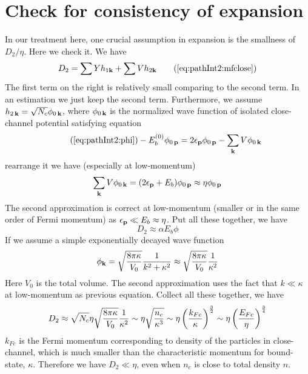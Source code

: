 \section{Check for consistency of expansion\label{sec:pathApp:consistency}}
In our treatment here, one crucial assumption in expansion is the smallness of $D_{2}/\eta$.  Here we check it.  We have 
\begin{equation}
D_{2}=\sum{}Yh_{1\vk}+\sum{}Vh_{2\vk}\tag{\ref{eq:pathInt2:mfclose}}
\end{equation}
The first term on the right is relatively small comparing to the second term.  In an estimation we just keep the second term.  Furthermore,  we assume $h_{2\,\mathbf{k}}=\sqrt{N_{c}}\phi_{0\,\mathbf{k}}$, where $\phi_{0\,\mathbf{k}}$ is the normalized wave function of isolated close-channel potential satisfying \sch equation
\begin{equation}\tag{\ref{eq:pathInt2:phi}}
-E_{b}^{(0)}\phi_{0\,\vp}=2\epsilon_{\vp}\phi_{0\,\vp}-\sum_{\vk}V \phi_{0\,\vk}
\end{equation}
rearrange it we have (especially at low-momentum)
\begin{equation*}
\sum_{\mathbf{k}}V \phi_{0\,\mathbf{k}}=(2\epsilon_{\mathbf{p}}+E_{b})\phi_{0\,\mathbf{p}}\approx{\eta}\phi_{0\,\mathbf{p}}
\end{equation*}
The second approximation is correct at low-momentum (smaller or in the same order of Fermi momentum) as $\epsilon_{\mathbf{p}}\ll{}E_{b}\approx\eta$.  Put all these together, we have
\begin{equation*}
D_{2}\approx\alpha{}E_{b}\phi
\end{equation*}
If we assume a simple exponentially decayed wave function
\begin{equation*}
\phi_{\mathbf{k}}=\sqrt{\frac{8\pi\kappa}{V_{0}}}\frac{1}{k^{2}+\kappa^{2}}\approx\sqrt{\frac{8\pi\kappa}{V_{0}}}\frac{1}{\kappa^{2}}
\end{equation*}
Here  $V_{0}$ is the total volume.  The second approximation uses the fact that $k\ll\kappa$ at low-momentum as previous equation.  Collect all these together, we have
\begin{equation}
D_{2}\approx\sqrt{N_{c}}\eta\sqrt{\frac{8\pi\kappa}{V_{0}}}\frac{1}{\kappa^{2}}
\sim\eta\sqrt\frac{n_{c}}{\kappa^{3}}
\sim\eta\left(\frac{k_{Fc}}{\kappa}\right)^{\frac{3}{2}}
\sim\eta\left(\frac{E_{Fc}}{\eta}\right)^{\frac{3}{4}}
\end{equation}
$k_{Fc}$ is the Fermi momentum corresponding to density of the particles in close-channel, which is much smaller than the characteristic momentum for bound-state, $\kappa$.   Therefore we have $D_{2}\ll\eta$, even when $n_{c}$ is close to total density $n$. 

